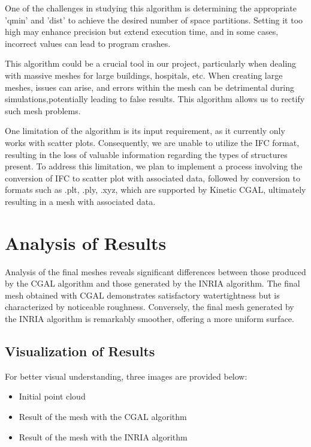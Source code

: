 \documentclass{article}
\begin{document}
  One of the challenges in studying this algorithm is determining the appropriate 'qmin' and 'dist' to achieve the desired number of space partitions.
  Setting it too high may enhance precision but extend execution time, and in some cases, incorrect values can lead to program crashes.

This algorithm could be a crucial tool in our project, particularly when dealing with massive meshes for large buildings,
hospitals, etc. When creating large meshes, issues can arise, and errors within the mesh can be detrimental during simulations,potentially leading to false results. 
This algorithm allows us to rectify such mesh problems.

One limitation of the algorithm is its input requirement, as it currently only works with scatter plots. Consequently, we are unable to utilize the IFC format, 
resulting in the loss of valuable information regarding the types of structures present. To address this limitation, 
we plan to implement a process involving the conversion of IFC to scatter plot with associated data, followed by conversion to formats such as .plt, .ply, .xyz,
which are supported by Kinetic CGAL, ultimately resulting in a mesh with associated data.


\section{Analysis of Results}

Analysis of the final meshes reveals significant differences between those produced by the CGAL algorithm and those generated by the INRIA algorithm. The final mesh obtained with CGAL demonstrates satisfactory watertightness but is characterized by noticeable roughness. Conversely, the final mesh generated by the INRIA algorithm is remarkably smoother, offering a more uniform surface.

\subsection{Visualization of Results}

For better visual understanding, three images are provided below:

\begin{itemize}
    \item Initial point cloud
    \item Result of the mesh with the CGAL algorithm
    \item Result of the mesh with the INRIA algorithm
\end{itemize}
\end{document}
